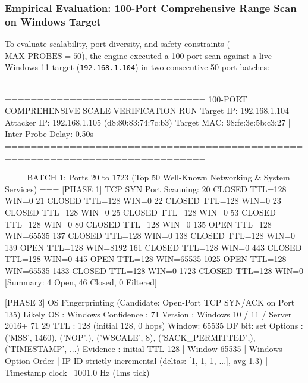 \FloatBarrier
\subsubsection{Empirical Evaluation: 100-Port Comprehensive Range Scan on Windows Target}
To evaluate scalability, port diversity, and safety constraints ($\text{MAX\_PROBES} = 50$), the
engine executed a 100-port scan against a live Windows 11 target (\texttt{192.168.1.104}) in two
consecutive 50-port batches:

\begin{logbox}
=============================================================================
100-PORT COMPREHENSIVE SCALE VERIFICATION RUN
Target IP: 192.168.1.104 | Attacker IP: 192.168.1.105 (d8:80:83:74:7c:b3)
Target MAC: 98:fe:3e:5b:c3:27 | Inter-Probe Delay: 0.50s
=============================================================================

=== BATCH 1: Ports 20 to 1723 (Top 50 Well-Known Networking & System Services) ===
[PHASE 1] TCP SYN Port Scanning:
    20  CLOSED                         TTL=128 WIN=0
    21  CLOSED                         TTL=128 WIN=0
    22  CLOSED                         TTL=128 WIN=0
    23  CLOSED                         TTL=128 WIN=0
    25  CLOSED                         TTL=128 WIN=0
    53  CLOSED                         TTL=128 WIN=0
    80  CLOSED                         TTL=128 WIN=0
   135  OPEN                           TTL=128 WIN=65535
   137  CLOSED                         TTL=128 WIN=0
   138  CLOSED                         TTL=128 WIN=0
   139  OPEN                           TTL=128 WIN=8192
   161  CLOSED                         TTL=128 WIN=0
   443  CLOSED                         TTL=128 WIN=0
   445  OPEN                           TTL=128 WIN=65535
  1025  OPEN                           TTL=128 WIN=65535
  1433  CLOSED                         TTL=128 WIN=0
  1723  CLOSED                         TTL=128 WIN=0
[Summary: 4 Open, 46 Closed, 0 Filtered]

[PHASE 3] OS Fingerprinting (Candidate: Open-Port TCP SYN/ACK on Port 135)
  Likely OS  : Windows                 Confidence : 71%
  Version    : Windows 10 / 11 / Server 2016+
               71%
               29%
  TTL        : 128 (initial 128, 0 hops)   Window: 65535    DF bit: set
  Options    : ('MSS', 1460), ('NOP',), ('WSCALE', 8), ('SACK_PERMITTED',), ('TIMESTAMP', ...)
  Evidence   : initial TTL 128 | Window 65535 | Windows Option Order | IP-ID strictly incremental (deltas: [1, 1, 1, ...], avg 1.3) | Timestamp clock ~1001.0 Hz (1ms tick)


\end{logbox}
